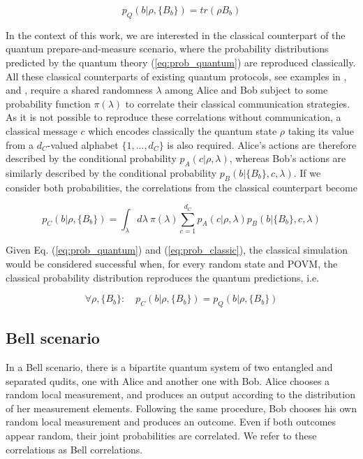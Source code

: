 \begin{equation}\label{eq:prob_quantum}
p_Q(b|\rho,\{B_b\}) = tr(\rho B_b)
\end{equation}

In the context of this work, we are interested in the classical counterpart of the quantum prepare-and-measure scenario, where the probability distributions predicted by the quantum theory (\ref{eq:prob_quantum}) are reproduced classically. All these classical counterparts of existing quantum protocols, see examples in \cite{cerf2000}, \cite{toner2003} and \cite{renner2022}, require a shared randomness $\lambda$ among Alice and Bob subject to some probability function $\pi(\lambda)$ to correlate their classical communication strategies. As it is not possible to reproduce these correlations without communication, a classical message $c$ which encodes classically the quantum state $\rho$ taking its value from a $d_C$-valued alphabet $\{1,...,d_C\}$ is also required. Alice's actions are therefore described by the conditional probability $p_A(c|\rho,\lambda)$, whereas Bob's actions are similarly described by the conditional probability $p_B(b|\{B_b\},c,\lambda)$. If we consider both probabilities, the correlations from the classical counterpart become

\begin{equation}\label{eq:prob_classic}
p_C(b|\rho,\{B_b\}) = \int_{\lambda} d\lambda\ \pi(\lambda) \sum_{c=1}^{d_C} p_A(c|\rho, \lambda) p_B(b|\{B_b\}, c, \lambda)
\end{equation}

Given Eq. (\ref{eq:prob_quantum}) and (\ref{eq:prob_classic}), the classical simulation would be considered successful when, for every random state and POVM, the classical probability distribution reproduces the quantum predictions, i.e.

\begin{equation}\label{eq:prob_classic_quantum}
\forall \rho, \{B_b\}:\quad p_C(b|\rho,\{B_b\}) = p_Q(b|\rho,\{B_b\})
\end{equation}

\subsection{Bell scenario}
In a Bell scenario, there is a bipartite quantum system of two entangled and separated qudits, one with Alice and another one with Bob. 
Alice chooses a random local measurement, and produces an output according to the distribution of her measurement elements. Following the same procedure, Bob chooses his own random local measurement and produces an outcome. Even if both outcomes appear random, their joint probabilities are correlated. We refer to these correlations as Bell correlations.

